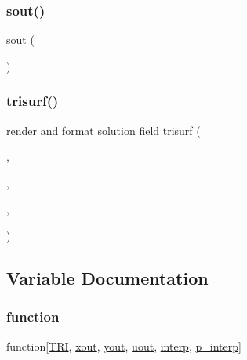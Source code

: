\subsubsection{\texorpdfstring{sout()}{sout()}}
{\footnotesize\ttfamily sout (\begin{DoxyParamCaption}\item[{\hyperlink{a00563_ad95e1f06b6be929c6b670b2a9a80d5cc}{sk}}]{ }\end{DoxyParamCaption})}

\mbox{\label{a00563_a262ff24ee701ceda68e45731f3f8f5b3}} 
\subsubsection{\texorpdfstring{trisurf()}{trisurf()}}
{\footnotesize\ttfamily render and format solution field trisurf (\begin{DoxyParamCaption}\item[{\hyperlink{a00563_a558baeb50ad046e899b5e64f957b043f}{T\+RI}}]{,  }\item[{\hyperlink{a00563_aa43b7c30923e8fcf939fe12082a19359}{xout}(\+:)}]{,  }\item[{\hyperlink{a00563_a440aa7a05dec25dc6fe586eaa162395b}{yout}(\+:)}]{,  }\item[{\hyperlink{a00563_a5c8d8342682becd112eb9de226d6053f}{uout}(\+:)}]{ }\end{DoxyParamCaption})}



\subsection{Variable Documentation}
\mbox{\label{a00563_a8acf1654b3cf5e5e470e3de2050c8a88}} 
\subsubsection{\texorpdfstring{function}{function}}
{\footnotesize\ttfamily function\mbox{[}\hyperlink{a00563_a558baeb50ad046e899b5e64f957b043f}{T\+RI}, \hyperlink{a00563_aa43b7c30923e8fcf939fe12082a19359}{xout}, \hyperlink{a00563_a440aa7a05dec25dc6fe586eaa162395b}{yout}, \hyperlink{a00563_a5c8d8342682becd112eb9de226d6053f}{uout}, \hyperlink{a00563_a7626c967b638c3cc70c7c96863cbd07f}{interp}, \hyperlink{a00563_a08a5429e87fabfe926dd685750b12894}{p\+\_\+interp}\mbox{]}}

